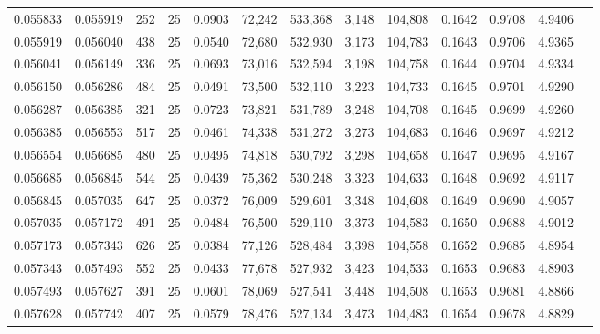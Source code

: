 \begin{tabular}{rrrrrrrrrrrrr}
0.055833 & 0.055919 &   252 &  25 &                                     0.0903 &  72,242 & 533,368 &   3,148 & 104,808 & 0.1642 & 0.9708 & 4.9406 \\
0.055919 & 0.056040 &   438 &  25 &                                     0.0540 &  72,680 & 532,930 &   3,173 & 104,783 & 0.1643 & 0.9706 & 4.9365 \\
0.056041 & 0.056149 &   336 &  25 &                                     0.0693 &  73,016 & 532,594 &   3,198 & 104,758 & 0.1644 & 0.9704 & 4.9334 \\
0.056150 & 0.056286 &   484 &  25 &                                     0.0491 &  73,500 & 532,110 &   3,223 & 104,733 & 0.1645 & 0.9701 & 4.9290 \\
0.056287 & 0.056385 &   321 &  25 &                                     0.0723 &  73,821 & 531,789 &   3,248 & 104,708 & 0.1645 & 0.9699 & 4.9260 \\
0.056385 & 0.056553 &   517 &  25 &                                     0.0461 &  74,338 & 531,272 &   3,273 & 104,683 & 0.1646 & 0.9697 & 4.9212 \\
0.056554 & 0.056685 &   480 &  25 &                                     0.0495 &  74,818 & 530,792 &   3,298 & 104,658 & 0.1647 & 0.9695 & 4.9167 \\
0.056685 & 0.056845 &   544 &  25 &                                     0.0439 &  75,362 & 530,248 &   3,323 & 104,633 & 0.1648 & 0.9692 & 4.9117 \\
0.056845 & 0.057035 &   647 &  25 &                                     0.0372 &  76,009 & 529,601 &   3,348 & 104,608 & 0.1649 & 0.9690 & 4.9057 \\
0.057035 & 0.057172 &   491 &  25 &                                     0.0484 &  76,500 & 529,110 &   3,373 & 104,583 & 0.1650 & 0.9688 & 4.9012 \\
0.057173 & 0.057343 &   626 &  25 &                                     0.0384 &  77,126 & 528,484 &   3,398 & 104,558 & 0.1652 & 0.9685 & 4.8954 \\
0.057343 & 0.057493 &   552 &  25 &                                     0.0433 &  77,678 & 527,932 &   3,423 & 104,533 & 0.1653 & 0.9683 & 4.8903 \\
0.057493 & 0.057627 &   391 &  25 &                                     0.0601 &  78,069 & 527,541 &   3,448 & 104,508 & 0.1653 & 0.9681 & 4.8866 \\
0.057628 & 0.057742 &   407 &  25 &                                     0.0579 &  78,476 & 527,134 &   3,473 & 104,483 & 0.1654 & 0.9678 & 4.8829 \\

\end{tabular}
